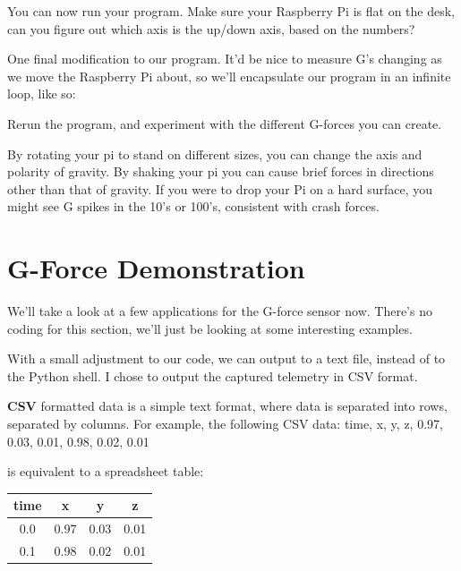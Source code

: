 \documentclass[a4paper, twocolumn, twoside, 12pt]{article}
\newenvironment{aside}
		{
		\begin{mdframed}[
			style=0,%
			leftline=false,
			rightline=false,
			innerbottommargin=2pt,
			innerleftmargin=12pt,
			innerrightmargin=0pt,
			linewidth=0.75pt,
			skipabove=6pt,
			skipbelow=6pt
			]
				\small
				\color{JungleGreen}
				\setlength{\parskip}{2pt}
				\vspace{2pt} %
		}
		{
		\end{mdframed}
		}
\begin{document}
			You can now run your program. Make sure your Raspberry Pi is flat on the desk, can you figure out which axis is the up/down axis, based on the numbers?
			
			One final modification to our program. It'd be nice to measure G's changing as we move the Raspberry Pi about, so we'll encapsulate our program in an infinite loop, like so:
			
			
			
			Rerun the program, and experiment with the different G-forces you can create.
			
			By rotating your pi to stand on different sizes, you can change the axis and polarity of gravity. By shaking your pi you can cause brief forces in directions
			other than that of gravity. If you were to drop your Pi on a hard surface, you might see G spikes in the 10's or 100's, consistent with crash forces.
	
	\section{G-Force Demonstration}
	
		We'll take a look at a few applications for the G-force sensor now. There's no coding for this section, we'll just be looking at some interesting examples.
		
		With a small adjustment to our code, we can output to a text file, instead of to the Python shell. I chose to output the captured telemetry in CSV format.
		
		\begin{aside}
		\textbf{CSV} formatted data is a simple text format, where data is separated into rows, separated by columns. For example, the following CSV data:
		\color{Black}
		\newline time, x, y, z, 0.97, 0.03, 0.01, 0.98, 0.02, 0.01
		\color{JungleGreen}
		
		is equivalent to a spreadsheet table:
		\color{Black}
		\begin{tabular}{|c|c|c|c|}
			\hline time & x & y & z \\ 
			\hline 0.0 & 0.97 & 0.03 & 0.01 \\ 
			\hline 0.1 & 0.98 & 0.02 & 0.01 \\ 
			\hline 
		\end{tabular}
		\end{aside}
\end{document}
